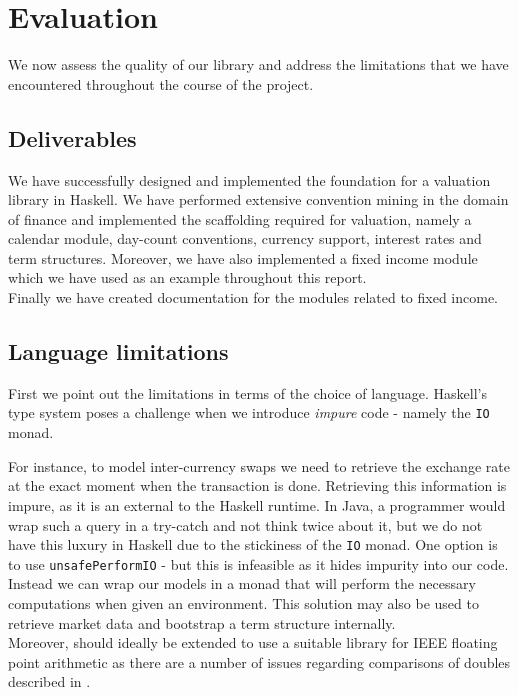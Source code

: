 \chapter{Evaluation}

We now assess the quality of our library and address the limitations that we
have encountered throughout the course of the project.

\section{Deliverables}

We have successfully designed and implemented the foundation for a valuation 
library in Haskell. We have performed extensive convention mining in the domain
of finance and implemented the scaffolding required for valuation, 
namely a calendar module, day-count conventions, currency support, interest 
rates and term structures. Moreover, we have also implemented a fixed income 
module which we have used as an example throughout this report.\\
Finally we have created documentation for the modules related to fixed 
income\cite{hqldoc}.

\section{Language limitations}

First we point out the limitations in terms of the choice of language.
Haskell's type system poses a challenge when we introduce
\emph{impure} code - namely the \texttt{IO} monad.

For instance, to model inter-currency swaps we need to retrieve the exchange 
rate at the exact moment when the transaction is done. Retrieving this 
information is impure, as it is an external to the Haskell runtime. In Java, a 
programmer would wrap such a query in a try-catch and not think twice about it,
but we do not have this luxury in Haskell due to the stickiness of the 
\texttt{IO} monad. One option is to use \texttt{unsafePerformIO} - but this is 
infeasible as it hides impurity into our code.
Instead we can wrap our models in a monad that will perform the necessary 
computations when given an environment. This solution may also be used to 
retrieve market data and bootstrap a term structure internally.\\

Moreover, \hql should ideally be extended to use a suitable library for
IEEE floating point arithmetic as there are a number of issues regarding
comparisons of doubles described in \cite{blogpost}.\\

